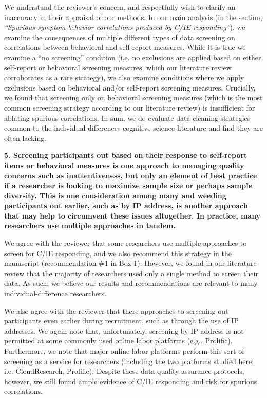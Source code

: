 \documentclass[a4paper,notitlepage,12pt]{article}
\begin{document}
We understand the reviewer's concern, and respectfully wish to clarify an inaccuracy in their appraisal of our methods. In our main analysis (in the section, \textit{``Spurious symptom-behavior correlations produced by C/IE responding''}), we examine the consequences of multiple different types of data screening on correlations between behavioral and self-report measures. While it is true we examine a ``no screening'' condition (i.e. no exclusions are applied based on either self-report or behavioral screening measures, which our literature review corroborates as a rare strategy), we also examine conditions where we apply exclusions based on behavioral and/or self-report screening measures. Crucially, we found that screening only on behavioral screening measures (which is the most common screening strategy according to our literature review) is insufficient for ablating spurious correlations. In sum, we do evaluate data cleaning strategies common to the individual-differences cognitive science literature and find they are often lacking. 

\textbf{5. Screening participants out based on their response to self-report items or behavioral measures is one approach to managing quality concerns such as inattentiveness, but only an element of best practice if a researcher is looking to maximize sample size or perhaps sample diversity. This is one consideration among many and weeding participants out earlier, such as by IP address, is another approach that may help to circumvent these issues altogether. In practice, many researchers use multiple approaches in tandem.}

We agree with the reviewer that some researchers use multiple approaches to screen for C/IE responding, and we also recommend this strategy in the manuscript (recommendation \#1 in Box 1). However, we found in our literature review that the majority of researchers used only a single method to screen their data. As such, we believe our results and recommendations are relevant to many individual-difference researchers. 

We also agree with the reviewer that there approaches to screening out participants even earlier during recruitment, such as through the use of IP addresses. We again note that, unfortunately,  screening by IP address is not permitted at some commonly used online labor platforms (e.g., Prolific). Furthermore, we note that major online labor platforms perform this sort of screening as a service for researchers (including the two platforms studied here; i.e. CloudResearch, Prolific). Despite these data quality assurance protocols, however, we still found ample evidence of C/IE responding and risk for spurious correlations.
\end{document}
